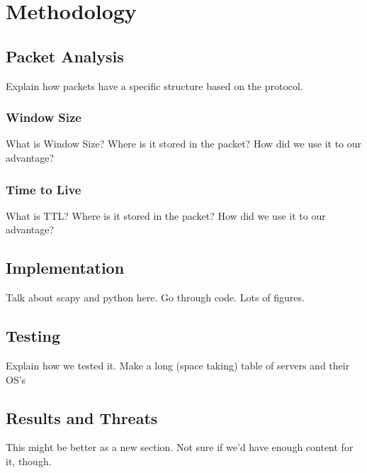 \section{Methodology}

\subsection{Packet Analysis}
Explain how packets have a specific structure based on the protocol.

\subsubsection{Window Size}
What is Window Size? Where is it stored in the packet? How did we use it to our advantage?

\subsubsection{Time to Live}
What is TTL? Where is it stored in the packet? How did we use it to our advantage?

\subsection{Implementation}
Talk about scapy and python here.
Go through code.
Lots of figures.

\subsection{Testing}
Explain how we tested it. Make a long (space taking) table of servers and their OS's

\subsection{Results and Threats}
This might be better as a new section. Not sure if we'd have enough content for it, though.